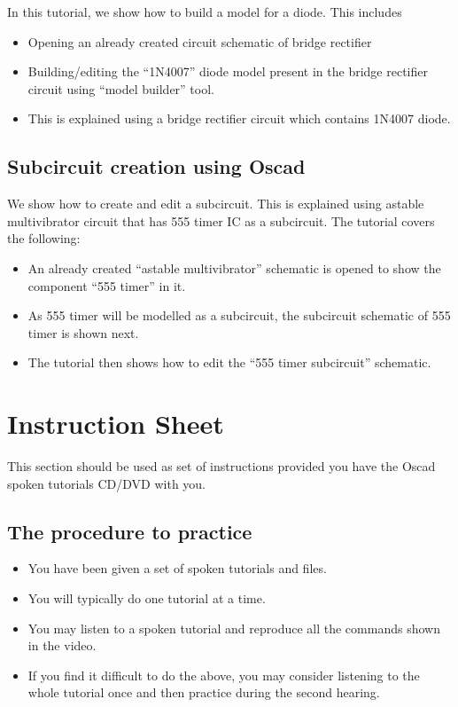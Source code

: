 In this tutorial, we show how to build a model for a diode. This includes

\begin{itemize}
\item Opening an already created circuit schematic of bridge rectifier
\item Building/editing the “1N4007” diode model present in the bridge rectifier circuit using “model builder” tool.
\item This is explained using a bridge rectifier circuit which contains 1N4007 diode.

\end{itemize}
\subsection{Subcircuit creation using Oscad}

We show how to create and edit a subcircuit. This is explained using astable multivibrator circuit that has 555 timer IC as a subcircuit. The tutorial covers the following:

\begin{itemize}
\item An already created “astable multivibrator” schematic is opened to show the component “555 timer” in it.
\item As 555 timer will be modelled as a subcircuit, the subcircuit schematic of 555 timer is shown next.
\item The tutorial then shows how to edit the  “555 timer subcircuit” schematic.
\end{itemize}




\section{Instruction Sheet}

This section should be used as set of instructions provided you have the Oscad spoken tutorials CD/DVD with you.



\subsection{The procedure to practice}
  \begin{itemize}
  \item You have been given a set of spoken tutorials and files.
  \item You will typically do one tutorial at a time.
  \item You may listen to a spoken tutorial and reproduce all the commands shown in the video.
  \item If you find it difficult to do the above, you may consider listening to the whole tutorial once and then practice during the second hearing.
 
 \end{itemize}
  

